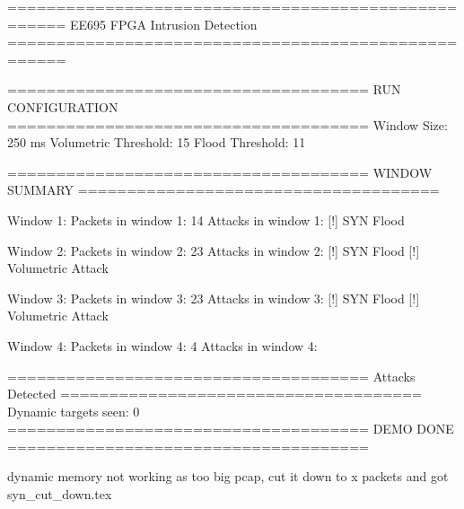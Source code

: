 ====================================================
        EE695 FPGA Intrusion Detection 
====================================================


=====================================
RUN CONFIGURATION
=====================================
Window Size: 250 ms
Volumetric Threshold: 15
Flood Threshold: 11


=====================================
WINDOW SUMMARY
=====================================

Window 1:
Packets in window 1: 14
Attacks in window 1:
  [!] SYN Flood

Window 2:
Packets in window 2: 23
Attacks in window 2:
  [!] SYN Flood
  [!] Volumetric Attack

Window 3:
Packets in window 3: 23
Attacks in window 3:
  [!] SYN Flood
  [!] Volumetric Attack

Window 4:
Packets in window 4: 4
Attacks in window 4:


=====================================
Attacks Detected
=====================================
Dynamic targets seen: 0
=====================================
             DEMO DONE
=====================================


dynamic memory not working as too big pcap, cut it down to x packets and got syn_cut_down.tex